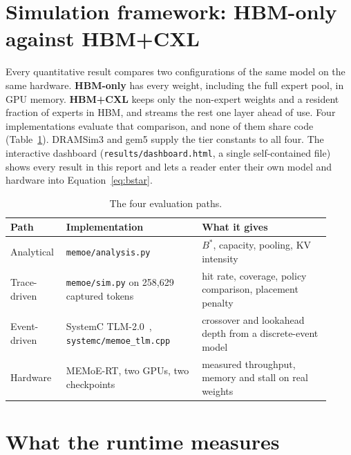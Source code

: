 \documentclass[10pt,a4paper]{article}
\begin{document}
\section{Simulation framework: HBM-only against HBM+CXL}
\label{sec:framework}

Every quantitative result compares two configurations of the same model on the
same hardware. \textbf{HBM-only} has every weight, including the full expert pool,
in GPU memory. \textbf{HBM+CXL} keeps only the non-expert weights and a resident
fraction of experts in HBM, and streams the rest one layer ahead of use. Four
implementations evaluate that comparison, and none of them share code
(Table~\ref{tab:framework}). DRAMSim3 and gem5 supply the tier constants to all
four. The interactive dashboard (\texttt{results/dashboard.html}, a single
self-contained file) shows every result in this report and lets a reader enter
their own model and hardware into Equation~\ref{eq:bstar}.

\begin{table}[htbp]
\centering\small
\caption{The four evaluation paths.}
\label{tab:framework}
\begin{tabular}{>{\raggedright\arraybackslash}p{0.14\linewidth}>{\raggedright\arraybackslash}p{0.40\linewidth}>{\raggedright\arraybackslash}p{0.38\linewidth}}
\toprule
Path & Implementation & What it gives \\
\midrule
Analytical & \texttt{memoe/analysis.py} & $B^{*}$, capacity, pooling, KV intensity \\
Trace-driven & \texttt{memoe/sim.py} on 258{,}629 captured tokens & hit rate, coverage, policy comparison, placement penalty \\
Event-driven & SystemC TLM-2.0~\cite{systemc}, \texttt{systemc/memoe\_tlm.cpp} & crossover and lookahead depth from a discrete-event model \\
Hardware & MEMoE-RT, two GPUs, two checkpoints & measured throughput, memory and stall on real weights \\
\bottomrule
\end{tabular}
\end{table}

\section{What the runtime measures}
\label{sec:runtime}
\end{document}
